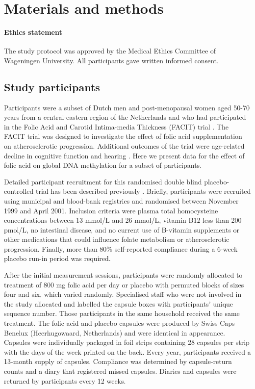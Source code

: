 \section[]{Materials and methods} %

\paragraph*{Ethics statement} 
The study protocol was approved by the Medical Ethics Committee of Wageningen University. All participants gave written informed consent.

\subsection{Study participants} %
\noindent Participants were a subset of Dutch men and post-menopausal women aged 50-70 years from a central-eastern region of the Netherlands and who had participated in the Folic Acid and Carotid Intima-media Thickness (FACIT) trial \cite{c416}. The FACIT trial was designed to investigate the effect of folic acid supplementation on atherosclerotic progression. Additional outcomes of the trial were age-related decline in cognitive function and hearing \cite{c417,c418,c419}. Here we present data for the effect of folic acid on global DNA methylation for a subset of participants.

\noindent Detailed participant recruitment for this randomised double blind placebo-controlled trial has been described previously \cite{c417}. Briefly, participants were recruited using municipal and blood-bank registries and randomised between November 1999 and April 2001. Inclusion criteria were plasma total homocysteine concentrations between 13 mmol/L and 26 mmol/L, vitamin B12 less than 200 pmol/L, no intestinal disease, and no current use of B-vitamin supplements or other medications that could influence folate metabolism or atherosclerotic progression. Finally, more than 80\% self-reported compliance during a 6-week placebo run-in period was required.

\noindent After the initial measurement sessions, participants were randomly allocated to treatment of 800 mg folic acid per day or placebo with permuted blocks of sizes four and six, which varied randomly. Specialised staff who were not involved in the study allocated and labelled the capsule boxes with participants' unique sequence number. Those participants in the same household received the same treatment. The folic acid and placebo capsules were produced by Swiss-Caps Benelux (Heerhugowaard, Netherlands) and were identical in appearance. Capsules were individually packaged in foil strips containing 28 capsules per strip with the days of the week printed on the back. Every year, participants received a 13-month supply of capsules. Compliance was determined by capsule-return counts and a diary that registered missed capsules. Diaries and capsules were returned by participants every 12 weeks.

